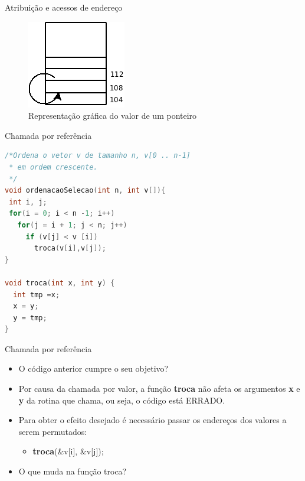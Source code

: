 \begin{frame}[plain,c]{Atribuição e acessos de endereço}  
  \begin{figure}[!htpb]
      \centering
      \includegraphics[width=.4\textwidth]{figs/fig_ponteiros/representacao_grafica_valor_ponteiro}
      \caption{Representação gráfica do valor de um ponteiro}
  \end{figure}
\end{frame}

\begin{frame}[fragile,c]{Chamada por referência}
\begin{lstlisting}[language=C]
/*Ordena o vetor v de tamanho n, v[0 .. n-1] 
 * em ordem crescente.
 */
void ordenacaoSelecao(int n, int v[]){
 int i, j;
 for(i = 0; i < n -1; i++)
   for(j = i + 1; j < n; j++)
     if (v[j] < v [i])
       troca(v[i],v[j]); 
}

void troca(int x, int y) {
  int tmp =x;
  x = y;
  y = tmp;
}
\end{lstlisting}
\end{frame}

\begin{frame}[c]{Chamada por referência}
  \begin{itemize}[<+->]
    \item O código anterior cumpre o seu objetivo?
    \item Por causa da chamada por valor, a função \textbf{troca} não afeta os argumentos \textbf{x} e \textbf{y} da rotina que chama, ou seja, o código está \alert{ERRADO}.
    \item Para obter o efeito desejado é necessário passar os endereços dos valores a serem permutados:   
    \begin{itemize}
      \item \textbf{troca}(\&v[i], \&v[j]); 
    \end{itemize}
    \item O que muda na função troca?
  \end{itemize}
\end{frame}

